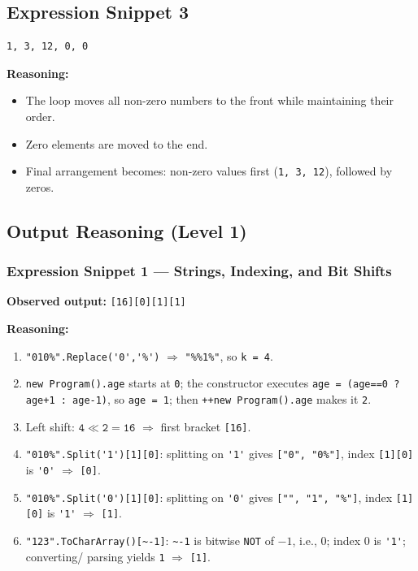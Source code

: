 \subsection*{Expression Snippet 3}
\begin{verbatim}
1, 3, 12, 0, 0
\end{verbatim}

\textbf{Reasoning:}
\begin{itemize}
    \item The loop moves all non-zero numbers to the front while maintaining their order.
    \item Zero elements are moved to the end.
    \item Final arrangement becomes: non-zero values first (\texttt{1, 3, 12}), followed by zeros.
\end{itemize}

\subsection{Output Reasoning (Level 1)}

\subsubsection*{Expression Snippet 1 — Strings, Indexing, and Bit Shifts}
\textbf{Observed output:} \verb|[16][0][1][1]|

\textbf{Reasoning:}
\begin{enumerate}
  \item \verb|"010%".Replace('0','%')| $\Rightarrow$ \verb|"%%1%"|, so \verb|k = 4|.
  \item \verb|new Program().age| starts at \verb|0|; the constructor executes \verb|age = (age==0 ? age+1 : age-1)|, so \verb|age = 1|; then \verb|++new Program().age| makes it \verb|2|.
  \item Left shift: \(\mathtt{4 \ll 2 = 16}\) $\Rightarrow$ first bracket \verb|[16]|.
  \item \verb|"010%".Split('1')[1][0]|: splitting on \verb|'1'| gives \verb|["0", "0%"]|, index \verb|[1][0]| is \verb|'0'| $\Rightarrow$ \verb|[0]|.
  \item \verb|"010%".Split('0')[1][0]|: splitting on \verb|'0'| gives \verb|["", "1", "%"]|, index \verb|[1][0]| is \verb|'1'| $\Rightarrow$ \verb|[1]|.
  \item \verb|"123".ToCharArray()[~-1]|: \verb|~-1| is bitwise \texttt{NOT} of \(-1\), i.e., \(0\); index \(0\) is \verb|'1'|; converting/ parsing yields \verb|1| $\Rightarrow$ \verb|[1]|.
\end{enumerate}

